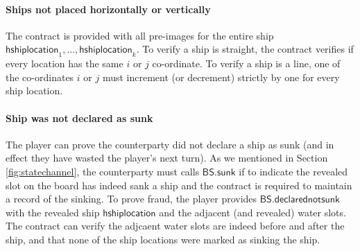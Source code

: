 \documentclass{llncs}
\newcommand{\instantiatedno}{\mathsf{NO}}
\newcommand{\gamestatus}{\mathsf{phase}}
\newcommand{\gamewinner}{\mathsf{WIN}}
\newcommand{\hslot}{\mathsf{hslot}}
\newcommand{\hshiplocation}{\mathsf{hshiplocation}}
\newcommand{\participant}{\mathcal{P}}
\newcommand{\sign}{\mathsf{Sign}}
\newcommand{\battleshipsinking}{\mathsf{BS.sunk}}
\newcommand{\battleshipnotsunk}{\mathsf{BS.declarednotsunk}}
\newcommand{\appcontract}{\mathsf{AC}}
\begin{document}
\paragraph{Ships not placed horizontally or vertically} 
The contract is provided with all pre-images for the entire ship $\hshiplocation_{1}, ..., \hshiplocation_{k}$.
To verify a ship is straight, the contract verifies if every location has the same $i$ or $j$ co-ordinate. 
To verify a ship is a line, one of the co-ordinates $i$ or $j$ must increment (or decrement) strictly by one for every ship location. 

\paragraph{Ship was not declared as sunk}
The player can prove the counterparty did not declare a ship as sunk (and in effect they have wasted  the player's next turn).  
As we mentioned in Section \ref{fig:statechannel}, the counterparty must calls $\battleshipsinking$ if to indicate the revealed slot on the board has indeed sank a ship and the contract is required to maintain a record of the sinking. 
To prove fraud, the player provides $\battleshipnotsunk$ with the revealed ship $\hshiplocation$ and the adjacent (and revealed) water slots. 
The contract can verify the adjcaent water slots are indeed before and after the ship, and that none of the ship locations were marked as sinking the ship. 




\end{document}
